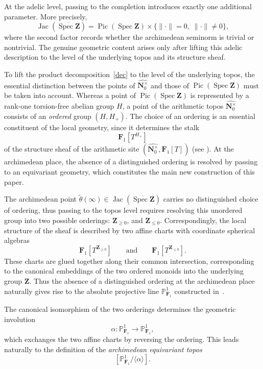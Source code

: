\documentclass[11pt,a4paper]{article}
\newcommand{\N}{\mathbf{N}}
\renewcommand{\P}{\mathbb{P}}
\newcommand{\Z}{\mathbf{Z}}
\newcommand{\Fone}{\mathbf{F}_{1}}
\def\spz{\Spec \Z}
\def\spzb{\overline{\Spec \Z}}
\newcommand{\nato}{\widehat{\N^\times_0}}
\newcommand{\norm}{{\|\cdot\|}}
\newcommand{\Spec}{\operatorname{Spec}}
\newcommand{\Pic}{\operatorname{Pic}} \newcommand{\Jac}{\operatorname{Jac}}
\begin{document}
At the adelic level, passing to the completion introduces exactly one additional
parameter. More precisely,
\begin{equation}\label{dec}
\Jac(\spzb)=\Pic(\spz)\times\{\norm=0,\;\norm\neq0\},
\end{equation}
where the second factor records whether the archimedean seminorm is trivial or
nontrivial. The genuine geometric content arises only after lifting this
adelic description to the level of the underlying topos and its structure
sheaf.

To lift the product decomposition~\eqref{dec} to the level of the underlying
topos, the essential distinction between the points of $\nato$ and those of
$\Pic(\spz)$ must  be taken into account. Whereas a point of $\Pic(\spz)$ is represented by a rank-one
torsion-free abelian group $H$, a point of the arithmetic topos $\nato$
consists of an \emph{ordered} group
$
(H,H_+)$. 
The choice of an ordering is an essential constituent of the local geometry,
since it determines the stalk 
\[
\Fone[T^{H_+}]
\]
of the structure sheaf of the arithmetic site $(\nato,\Fone[T])$ (see \cite{CC1}).
At the archimedean place, the absence of a distinguished ordering is resolved
by passing to an equivariant geometry, which constitutes the main new
construction of this paper.\vspace{.05in}

 The archimedean point $\tilde\theta(\infty)\in\Jac(\spzb)$ carries no distinguished choice of ordering, thus passing to the topos level
 requires resolving this unordered group into two possible
orderings:
$
\Z_{\ge 0}$, and $\Z_{\le 0}$. Correspondingly, the local structure of the sheaf is described by two affine charts
with coordinate spherical algebras
\[
\Fone[T^{\Z_{\ge0}}]
\qquad\text{and}\qquad
\Fone[T^{\Z_{\le0}}].
\]
These charts are glued together along their common intersection, corresponding to the
canonical embeddings of the two ordered monoids into the underlying 
group $\Z$. Thus the absence of a distinguished ordering at the archimedean
place naturally gives rise to the absolute projective line
$\P^1_{\Fone}$ constructed in~\cite{CC10}.

The  canonical isomorphism of the two orderings
determines the geometric involution
\begin{equation}\label{alpha}
\alpha:\P^1_{\Fone}\longrightarrow\P^1_{\Fone},
\end{equation}
which exchanges the two affine charts by reversing the ordering. 
This leads naturally to the definition of the \emph{archimedean equivariant topos} 
\[
[\P^1_{\Fone}/\langle\alpha\rangle].
\]
\end{document}
